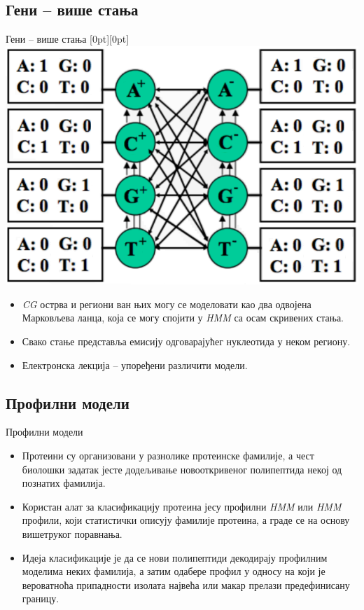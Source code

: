 \documentclass[hyperref={bookmarks=false}]{beamer}
\newcommand{\lenitem}[2][.43\linewidth]{\parbox[t]{#1}{\strut #2\strut}}
\begin{document}
\subsection{Гени -- више стања}
\begin{frame}{Гени -- више стања}
\mbox{}\hfill\raisebox{-\height}[0pt][0pt]{\includegraphics[width=.5\linewidth]{cg_stanja.png}}
\vspace*{-\baselineskip}

\begin{itemize}
\item \lenitem{\textit{CG} острва и региони ван њих могу се моделовати као два одвојена Марковљева ланца, која се могу спојити у \textit{HMM} са осам скривених стања.}
\item \lenitem{Свако стање представља емисију одговарајућег нуклеотида у неком региону.}
\item \lenitem{Електронска лекција -- упоређени различити модели.}
\end{itemize}
\end{frame}

\subsection{Профилни модели}
\begin{frame}{Профилни модели}
\begin{itemize}
\item Протеини су организовани у разнолике протеинске фамилије, а чест биолошки задатак јесте додељивање новооткривеног полипептида некој од познатих фамилија.
\item Користан алат за класификацију протеина јесу профилни \textit{HMM} или \textit{HMM} профили, који статистички описују фамилије протеина, а граде се на основу вишетруког поравнања.
\item Идеја класификације је да се нови полипептиди декодирају профилним моделима неких фамилија, а затим одабере профил у односу на који је вероватноћа припадности изолата највећа или макар прелази предефинисану границу.
\end{itemize}
\end{frame}
\end{document}
